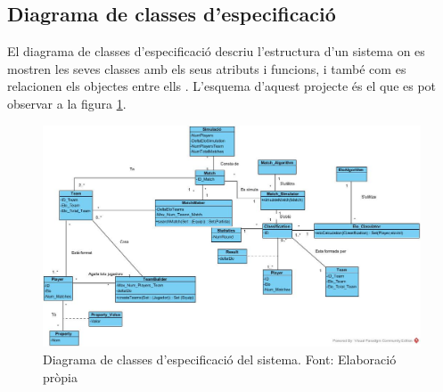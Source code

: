 \documentclass[a4paper]{article}
\begin{document}
\subsection{Diagrama de classes d'especificació}
El diagrama de classes d'especificació descriu l'estructura d'un sistema on es mostren les seves classes amb els seus atributs i funcions, i també com es relacionen els objectes entre ells \cite{wikipediaClassDiagram}. L'esquema d'aquest projecte és el que es pot observar a la figura \ref{fig:ClassDiagram}.
\begin{landscape}

\newpage
\thispagestyle{lndscape}
    \begin{center}
        \begin{figure}[h!]
            \includegraphics[width=1.5 \textwidth]{images/Diagrama_Classes2.jpg}%
            \caption[Diagrama de classes d'especificació del sistema]{Diagrama de classes d'especificació del sistema. Font: Elaboració pròpia}
            \label{fig:ClassDiagram}
        \end{figure}
    \end{center}
\end{landscape}

\newpage
\end{document}
